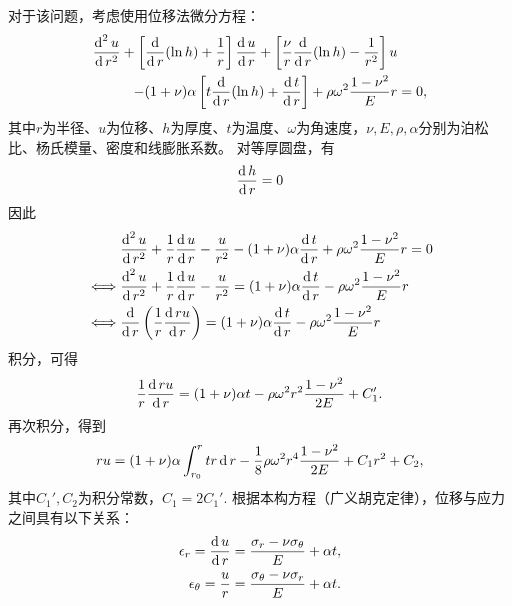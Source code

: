 对于该问题，考虑使用位移法微分方程：
\begin{equation}
    \begin{aligned}
        \frac{\dif^2 u}{\dif r^2} + \left[ \frac{\dif}{\dif r} (\ln h )+ \frac{1}{r} \right] \frac{\dif u}{\dif r} + 
        \left[\frac{\nu}{r}\frac{\dif}{\dif r} (\ln h) - \frac{1}{r^2}\right] u & \\ 
        - (1 + \nu) \alpha \left[ t \frac{\dif}{\dif r} (\ln h) + \frac{\dif t}{\dif r}\right] +
        \rho \omega^2 \frac{1 - \nu^2}{E} r &= 0,
    \end{aligned}
\end{equation}
其中$r$为半径、$u$为位移、$h$为厚度、$t$为温度、$\omega$为角速度，$\nu, E, \rho, \alpha$分别为泊松比、杨氏模量、密度和线膨胀系数。
对等厚圆盘，有
\begin{equation}
    \frac{\operatorname{\mathop{} \! \mathrm{d}} h}{\operatorname{\mathop{} \! \mathrm{d}} r} = 0
\end{equation}
因此
\begin{equation}
    \begin{aligned}
        & \frac{\dif^2 u}{\dif r^2} + \frac{1}{r} \frac{\dif u}{\dif r} - \frac{u}{r^2} - (1 + \nu) \alpha \frac{\dif t}{\dif r} + \rho \omega^2 \frac{1 - \nu^2}{E} r = 0 \\
        \iff & \frac{\dif^2 u}{\dif r^2} + \frac{1}{r} \frac{\dif u}{\dif r} - \frac{u}{r^2} = (1 + \nu) \alpha \frac{\dif t}{\dif r} - \rho \omega^2 \frac{1 - \nu^2}{E} r \\
        \iff & \frac{\dif}{\dif r}\left( \frac{1}{r} \frac{\dif ru}{\dif r} \right) = (1 + \nu) \alpha \frac{\dif t}{\dif r} - \rho \omega^2 \frac{1 - \nu^2}{E} r
    \end{aligned}
\end{equation}
积分，可得
\begin{equation}
    \frac{1}{r} \frac{\operatorname{\mathop{} \! \mathrm{d}} ru}{\operatorname{\mathop{} \! \mathrm{d}} r} = (1 + \nu) \alpha t- \rho \omega^2 r^2 \frac{1 - \nu^2}{2E} + C_1'.
\end{equation}
再次积分，得到
\begin{equation}
    ru = (1 + \nu) \alpha \int_{r_0}^r tr \operatorname{\mathop{} \! \mathrm{d}} r - \frac{1}{8} \rho \omega^2 r^4 \frac{1 - \nu^2}{2E} + C_1 r^2 + C_2,
\end{equation}
其中$C_1', C_2$为积分常数，$C_1 = 2C_1'$.
根据本构方程（广义胡克定律），位移与应力之间具有以下关系：
\begin{equation}
    \begin{aligned}
        \epsilon_r = \frac{\operatorname{\mathop{} \! \mathrm{d}} u}{\operatorname{\mathop{} \! \mathrm{d}} r} &= \frac{\sigma_r - \nu \sigma_\theta}{E} + \alpha t, \\
        \epsilon_\theta = \frac{u}{r} &= \frac{\sigma_\theta - \nu \sigma_r}{E} + \alpha t.
    \end{aligned}
\end{equation}
